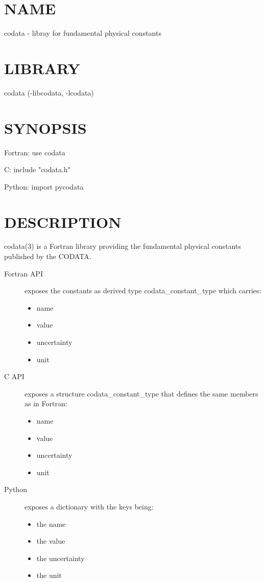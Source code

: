 \section*{NAME}
codata - libray for fundamental physical constants

\section*{LIBRARY}
codata (-libcodata, -lcodata)

\section*{SYNOPSIS}
{\ttfamily
Fortran: use codata

C: include "codata.h"

Python: import pycodata

}
\section*{DESCRIPTION}
codata(3) is a Fortran library providing the fundamental physical
constants published by the CODATA.

\begin{description}
\item[Fortran API] exposes the constants as derived type codata\_constant\_type
                   which carries:
\begin{itemize}
\item name
\item value
\item uncertainty
\item unit
\end{itemize}
\end{description}

\begin{description}
\item[C API] exposes a structure codata\_constant\_type that defines
             the same members as in Fortran:
\begin{itemize}
\item name
\item value
\item uncertainty
\item unit
\end{itemize}
\end{description}

\begin{description}
\item[Python] exposes a dictionary with the keys being:
\begin{itemize}
\item the name
\item the value
\item the uncertainty
\item the unit
\end{itemize}
\end{description}

